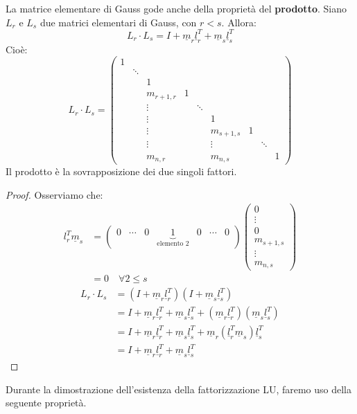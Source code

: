 \documentclass[12pt]{report}
\begin{document}
La matrice elementare di Gauss gode anche della proprietà del \textbf{prodotto}. Siano $L_r$ e $L_s$ due matrici elementari di Gauss, con $r < s$. Allora:
\[
L_r \cdot L_s = I + \underline{m}_r\underline{l}_r^T + \underline{m}_s\underline{l}_s^T
\]
Cioè:
\[
L_r\cdot L_s = \begin{pmatrix}
	1 \\
	& \ddots \\
	& & 1 \\
	& & m_{r+1, r} & 1 \\
	& & \vdots & & \ddots \\
	& & \vdots & & & 1 \\
	& & \vdots & & & m_{s+1, s} & 1 \\
	&  & \vdots & & & \vdots & & \ddots \\
	&  & m_{n, r} & & & m_{n, s} & & & 1
\end{pmatrix}
\]
Il prodotto è la sovrapposizione dei due singoli fattori.
\begin{proof} Osserviamo che:
\begin{align*}
l_r^T \underline{m}_s &= \begin{pmatrix}
	0 & \cdots & 0 & \underset{\text{elemento 2}}{\underbrace{1}} & 0 & \cdots & 0
\end{pmatrix}\begin{pmatrix}
	0 \\
	\vdots \\
	0 \\
	m_{s+1, s} \\
	\vdots \\
	m_{n, s}
\end{pmatrix} \\
&= 0 \quad \forall 2 \leq s
\end{align*}
\begin{align*}
L_r \cdot L_s &= (I + \underline{m}_r\underline{l}_r^T)(I + \underline{m}_s\underline{l}_s^T) \\
&= I + \underline{m}_r\underline{l}_r^T + \underline{m}_s\underline{l}_s^T + (\underline{m}_r\underline{l}_r^T)(\underline{m}_s\underline{l}_s^T) \\
&= I + \underline{m}_r\underline{l}_r^T + \underline{m}_s\underline{l}_s^T + \underline{m}_r(\underline{l}_r^T\underline{m}_s)\underline{l}_s^T \\
&= I + \underline{m}_r\underline{l}_r^T + \underline{m}_s\underline{l}_s^T
\end{align*}
\end{proof}
Durante la dimostrazione dell'esistenza della fattorizzazione LU, faremo uso della seguente proprietà.
\end{document}
